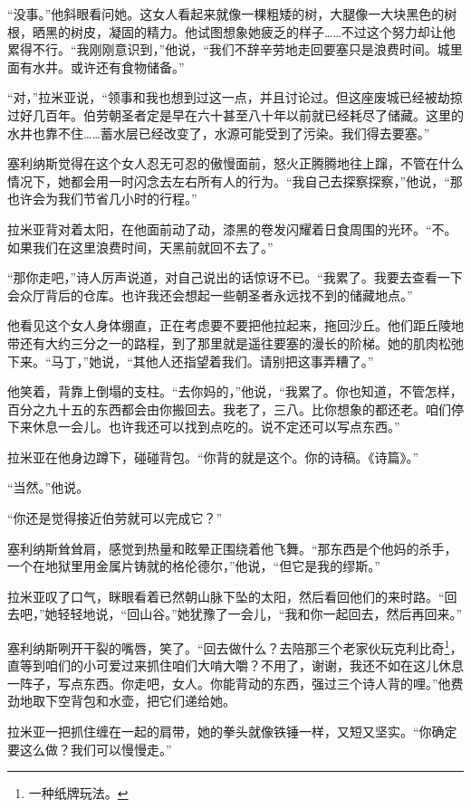 \documentclass[AutoFakeBold=true]{book}
\begin{document}
``没事。''他斜眼看问她。这女人看起来就像一棵粗矮的树，大腿像一大块黑色的树根，晒黑的树皮，凝固的精力。他试图想象她疲乏的样子……不过这个努力却让他累得不行。``我刚刚意识到，''他说，``我们不辞辛劳地走回要塞只是浪费时间。城里面有水井。或许还有食物储备。''

``对，''拉米亚说，``领事和我也想到过这一点，并且讨论过。但这座废城已经被劫掠过好几百年。伯劳朝圣者定是早在六十甚至八十年以前就已经耗尽了储藏。这里的水井也靠不住……蓄水层已经改变了，水源可能受到了污染。我们得去要塞。''

塞利纳斯觉得在这个女人忍无可忍的傲慢面前，怒火正腾腾地往上蹿，不管在什么情况下，她都会用一时闪念去左右所有人的行为。``我自己去探察探察，''他说，``那也许会为我们节省几小时的行程。''

拉米亚背对着太阳，在他面前动了动，漆黑的卷发闪耀着日食周围的光环。``不。如果我们在这里浪费时间，天黑前就回不去了。''

``那你走吧，''诗人厉声说道，对自己说出的话惊讶不已。``我累了。我要去查看一下会众厅背后的仓库。也许我还会想起一些朝圣者永远找不到的储藏地点。''

他看见这个女人身体绷直，正在考虑要不要把他拉起来，拖回沙丘。他们距丘陵地带还有大约三分之一的路程，到了那里就是遥往要塞的漫长的阶梯。她的肌肉松弛下来。``马丁，''她说，``其他人还指望着我们。请别把这事弄糟了。''

他笑着，背靠上倒塌的支柱。``去你妈的，''他说，``我累了。你也知道，不管怎样，百分之九十五的东西都会由你搬回去。我{\kaishu 老了}，三八。比你想象的都还老。咱们停下来休息一会儿。也许我还可以找到点吃的。说不定还可以写点东西。''

拉米亚在他身边蹲下，碰碰背包。``你背的就是这个。你的诗稿。《诗篇》。''

``当然。''他说。

``你还是觉得接近伯劳就可以完成它？''

塞利纳斯耸耸肩，感觉到热量和眩晕正围绕着他飞舞。``那东西是个他妈的杀手，一个在地狱里用金属片铸就的格伦德尔，''他说，``但它是我的缪斯。''

拉米亚叹了口气，眯眼看着已然朝山脉下坠的太阳，然后看回他们的来时路。``回去吧，''她轻轻地说，``回山谷。''她犹豫了一会儿，``我和你一起回去，然后再回来。''

塞利纳斯咧开干裂的嘴唇，笑了。``回去做什么？去陪那三个老家伙玩克利比奇\footnote{一种纸牌玩法。}，直等到咱们的小可爱过来抓住咱们大啃大嚼？不用了，谢谢，我还不如在这儿休息一阵子，写点东西。你走吧，女人。你能背动的东西，强过三个诗人背的哩。''他费劲地取下空背包和水壶，把它们递给她。

拉米亚一把抓住缠在一起的肩带，她的拳头就像铁锤一样，又短又坚实。``你确定要这么做？我们可以慢慢走。''
\end{document}

